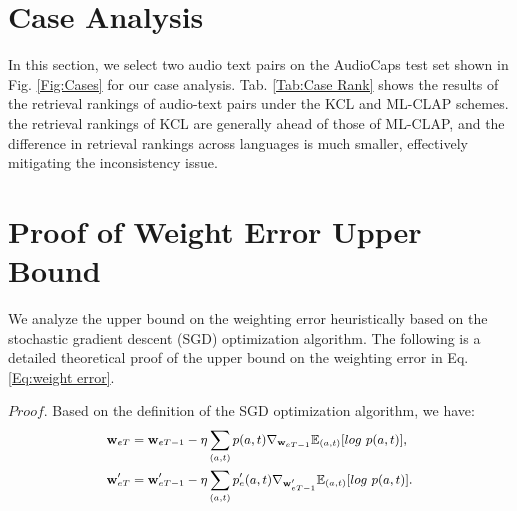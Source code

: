 \section{Case Analysis}
\label{Appe:Case Analysis}
In this section, we select two audio text pairs on the AudioCaps test set shown in Fig. \ref{Fig:Cases} for our case analysis. Tab. \ref{Tab:Case Rank} shows the results of the retrieval rankings of audio-text pairs under the KCL and ML-CLAP schemes. the retrieval rankings of KCL are generally ahead of those of ML-CLAP, and the difference in retrieval rankings across languages is much smaller, effectively mitigating the inconsistency issue.

\section{Proof of Weight Error Upper Bound}
\label{Appe:Proof of Weight Error Upper Bound}
We analyze the upper bound on the weighting error heuristically based on the stochastic gradient descent (SGD) optimization algorithm. The following is a detailed theoretical proof of the upper bound on the weighting error in Eq. \eqref{Eq:weight error}.

$Proof$. Based on the definition of the SGD optimization algorithm, we have:
\begin{equation}
\small
    \begin{aligned}
        \mathbf w_{eT}&=\mathbf w_{eT-1}-\eta\sum_{(a,t)}p(a,t)\nabla_{\mathbf w_{eT-1}}\mathbb{E}_{(a,t)}[log\ p(a,t)],\\
        \mathbf w'_{eT}&=\mathbf w'_{eT-1}-\eta\sum_{(a,t)}p_e'(a,t)\nabla_{\mathbf w'_{eT-1}}\mathbb{E}_{(a,t)}[log\ p(a,t)].
    \end{aligned}
\end{equation}

